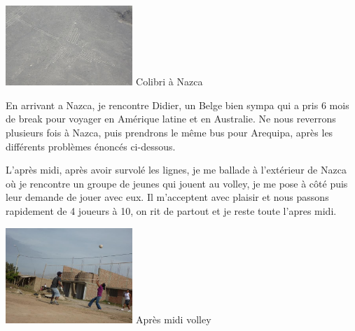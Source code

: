 \begin{multicols}{2}
\hspace*{-0.65cm}
\includegraphics[width=4.8cm]{articles/Cote-du-sud/1255996046TE4T.jpg}
Colibri à Nazca


En arrivant a Nazca, je rencontre Didier, un Belge bien sympa qui a pris 6 mois de break pour voyager en Amérique latine et en Australie.  Ne nous reverrons plusieurs fois à Nazca, puis prendrons le même bus pour Arequipa, après les différents problèmes énoncés ci-dessous.

L'après midi, après avoir survolé les lignes, je me ballade à l'extérieur de Nazca où je rencontre un groupe de jeunes qui jouent au volley, je me pose à côté puis leur demande de jouer avec eux. Il m'acceptent avec plaisir et nous passons rapidement de 4 joueurs à 10, on rit de partout et je reste toute l'apres midi.

\hspace*{-0.65cm}
\includegraphics[width=4.8cm]{articles/Cote-du-sud/1255996043Enc7.jpg}
Après midi volley



\end{multicols}
